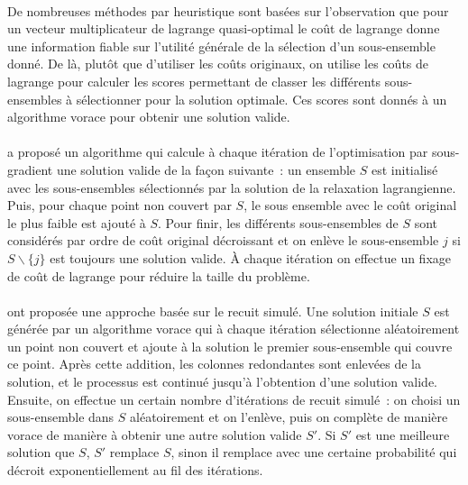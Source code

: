 \documentclass[12pt,letterpaper,twoside]{article}
\begin{document}
				\paragraph*{}
					De nombreuses méthodes par heuristique sont basées sur l'observation que pour un vecteur multiplicateur de lagrange quasi-optimal
					le coût de lagrange donne une information fiable sur l'utilité générale de la sélection d'un sous-ensemble donné.
					De là, plutôt que d'utiliser les coûts originaux, on utilise les coûts de lagrange pour calculer les scores permettant
					de classer les différents sous-ensembles à sélectionner pour la solution optimale. Ces scores sont donnés
					à un algorithme vorace pour obtenir une solution valide.~\cite{caprara2000algorithms}
				\paragraph*{}
					\citeauthor{Beasley1990} a proposé un algorithme qui calcule à chaque itération de l'optimisation par sous-gradient une
					solution valide de la façon suivante : un ensemble \(S\) est initialisé avec les sous-ensembles sélectionnés
					par la solution de la relaxation lagrangienne. Puis, pour chaque point non couvert par \(S\),
					le sous ensemble avec le coût original le plus faible est ajouté à \(S\). Pour finir, les différents sous-ensembles
					de \(S\) sont considérés par ordre de coût original décroissant et on enlève le sous-ensemble \(j\) si \(S \backslash \{j\}\)
					est toujours une solution valide. À chaque itération on effectue un fixage de coût de lagrange pour réduire la taille
					du problème.~\cite{Beasley1990}	
				\paragraph*{}
					\citeauthor{jacobs1995lsh} ont proposée une approche basée sur le recuit simulé. Une solution initiale \(S\)
					est générée par un algorithme vorace qui à chaque itération sélectionne aléatoirement un point non couvert
					et ajoute à la solution le premier sous-ensemble qui couvre ce point. Après cette addition, les colonnes
					redondantes sont enlevées de la solution, et le processus est continué jusqu'à l'obtention d'une solution valide.
					Ensuite, on effectue un certain nombre d'itérations de recuit simulé : on choisi un sous-ensemble dans \(S\) aléatoirement
					et on l'enlève, puis on complète de manière vorace de manière à obtenir une autre solution valide \(S'\). Si \(S'\)
					est une meilleure solution que \(S\), \(S'\) remplace \(S\), sinon il remplace avec une certaine probabilité qui
					décroit exponentiellement au fil des itérations.~\cite{jacobs1995lsh}
\end{document}
